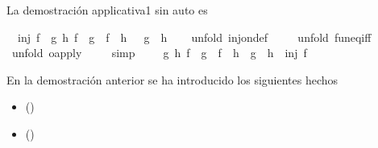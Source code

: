 \begin{isabellebody}
\begin{isamarkuptext}
  La demostración applicativa1 sin auto es%
\end{isamarkuptext}\isamarkuptrue%
\isamarkupfalse%
\isanewline
\ \ {\isachardoublequoteopen}inj\ f\ {\isasymLongrightarrow}\ {\isasymforall}g\ h{\isachardot}\ {\isacharparenleft}f\ {\isasymcirc}\ g\ {\isacharequal}\ f\ {\isasymcirc}\ h{\isacharparenright}\ {\isasymlongrightarrow}\ \ {\isacharparenleft}g\ {\isacharequal}\ h{\isacharparenright}{\isachardoublequoteclose}\isanewline
%
\isadelimproof
\ \ %
\endisadelimproof
%
\isatagproof
{}\isamarkupfalse%
\ {\isacharparenleft}unfold\ inj{\isacharunderscore}on{\isacharunderscore}def{\isacharparenright}\ \isanewline
\ \ \isamarkupfalse%
\ {\isacharparenleft}unfold\ fun{\isacharunderscore}eq{\isacharunderscore}iff{\isacharparenright}\ \isanewline
\ \ \isamarkupfalse%
\ {\isacharparenleft}unfold\ o{\isacharunderscore}apply{\isacharparenright}\isanewline
\ \ \ \isamarkupfalse%
\ simp{\isacharplus}\isanewline
\ \ \isamarkupfalse%
%
\endisatagproof
{\isafoldproof}%
%
\isadelimproof
\isanewline
%
\endisadelimproof
\isanewline
{}\isamarkupfalse%
\ \isanewline
{\isachardoublequoteopen}{\isasymforall}g\ h{\isachardot}\ {\isacharparenleft}f\ {\isasymcirc}\ g\ {\isacharequal}\ f\ {\isasymcirc}\ h\ {\isasymlongrightarrow}\ g\ {\isacharequal}\ h{\isacharparenright}\ {\isasymLongrightarrow}\ inj\ f{\isachardoublequoteclose}\isanewline
%
\isadelimproof
\ \ %
\endisadelimproof
%
\isatagproof
{}\isamarkupfalse%
%
\endisatagproof
{\isafoldproof}%
%
\isadelimproof
%
\endisadelimproof
%
\begin{isamarkuptext}%
En la demostración anterior se ha introducido los siguientes
  hechos
  \begin{itemize}
    \item {} \hfill ()
    \item {} \hfill ()
  \end{itemize} 


\end{isamarkuptext}
\end{isabellebody}
